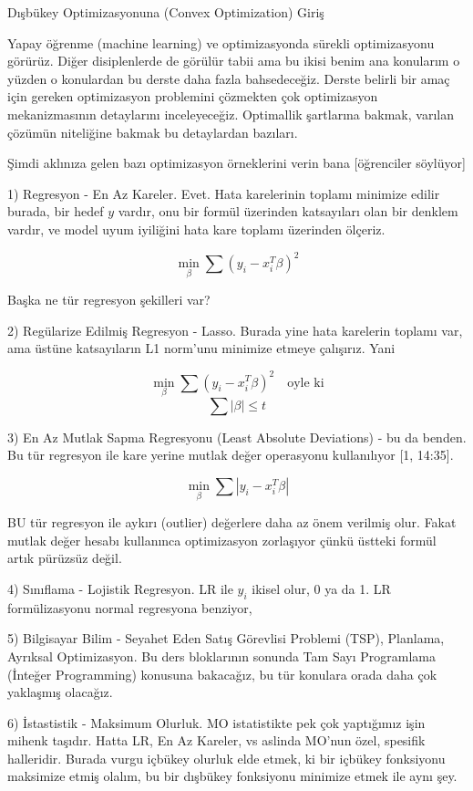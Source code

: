 \documentclass[12pt,fleqn]{article}\usepackage{../../common}
\begin{document}
Dışbükey Optimizasyonuna (Convex Optimization) Giriş

Yapay öğrenme (machine learning) ve optimizasyonda sürekli optimizasyonu
görürüz. Diğer disiplenlerde de görülür tabii ama bu ikisi benim ana
konularım o yüzden o konulardan bu derste daha fazla bahsedeceğiz. Derste
belirli bir amaç için gereken optimizasyon problemini çözmekten çok
optimizasyon mekanizmasının detaylarını inceleyeceğiz. Optimallik
şartlarına bakmak, varılan çözümün niteliğine bakmak bu detaylardan
bazıları.

Şimdi aklınıza gelen bazı optimizasyon örneklerini verin bana [öğrenciler
söylüyor]

1) Regresyon - En Az Kareler. Evet. Hata karelerinin toplamı minimize
edilir burada, bir hedef $y$ vardır, onu bir formül üzerinden katsayıları
olan bir denklem vardır, ve model uyum iyiliğini hata kare toplamı
üzerinden ölçeriz.

$$
\min_\beta \sum (y_i - x_i^T \beta)^2 
$$

Başka ne tür regresyon şekilleri var?  

2) Regülarize Edilmiş Regresyon - Lasso. Burada yine hata karelerin toplamı
var, ama üstüne katsayıların L1 norm'unu minimize etmeye çalışırız. Yani 

$$
\min_\beta \sum (y_i - x_i^T \beta)^2 \quad \textrm{oyle ki}
$$
$$
\sum |\beta| \le t
$$

3) En Az Mutlak Sapma Regresyonu (Least Absolute Deviations) - bu da
benden. Bu tür regresyon ile kare yerine mutlak değer operasyonu
kullanılıyor [1, 14:35].   

$$
\min_\beta \sum |y_i - x_i^T \beta |
$$

BU tür regresyon ile aykırı (outlier) değerlere daha az önem verilmiş
olur. Fakat mutlak değer hesabı kullanınca optimizasyon zorlaşıyor çünkü
üstteki formül artık pürüzsüz değil. 

4) Sınıflama - Lojistik Regresyon. LR ile $y_i$ ikisel olur, 0 ya da 1. LR
formülizasyonu normal regresyona benziyor, 

5) Bilgisayar Bilim - Seyahet Eden Satış Görevlisi Problemi (TSP),
Planlama, Ayrıksal Optimizasyon. Bu ders bloklarının sonunda Tam Sayı
Programlama (İnteğer Programming) konusuna bakacağız, bu tür konulara orada
daha çok yaklaşmış olacağız. 

6) İstastistik - Maksimum Olurluk. MO istatistikte pek çok yaptığımız işin
mihenk taşıdır. Hatta LR, En Az Kareler, vs aslinda MO'nun özel, spesifik
halleridir. Burada vurgu içbükey olurluk elde etmek, ki bir içbükey
fonksiyonu maksimize etmiş olalım, bu bir dışbükey fonksiyonu minimize
etmek ile aynı şey. 
\end{document}

